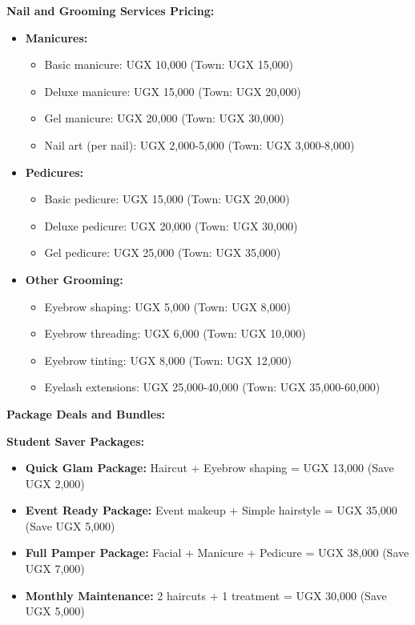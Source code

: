 \textbf{Nail and Grooming Services Pricing:}
\begin{itemize}[leftmargin=2em]
    \item \textbf{Manicures:}
    \begin{itemize}
        \item Basic manicure: UGX 10,000 (Town: UGX 15,000)
        \item Deluxe manicure: UGX 15,000 (Town: UGX 20,000)
        \item Gel manicure: UGX 20,000 (Town: UGX 30,000)
        \item Nail art (per nail): UGX 2,000-5,000 (Town: UGX 3,000-8,000)
    \end{itemize}
    
    \item \textbf{Pedicures:}
    \begin{itemize}
        \item Basic pedicure: UGX 15,000 (Town: UGX 20,000)
        \item Deluxe pedicure: UGX 20,000 (Town: UGX 30,000)
        \item Gel pedicure: UGX 25,000 (Town: UGX 35,000)
    \end{itemize}
    
    \item \textbf{Other Grooming:}
    \begin{itemize}
        \item Eyebrow shaping: UGX 5,000 (Town: UGX 8,000)
        \item Eyebrow threading: UGX 6,000 (Town: UGX 10,000)
        \item Eyebrow tinting: UGX 8,000 (Town: UGX 12,000)
        \item Eyelash extensions: UGX 25,000-40,000 (Town: UGX 35,000-60,000)
    \end{itemize}
\end{itemize}

\vspace{1em}

\textbf{Package Deals and Bundles:}

\textbf{Student Saver Packages:}
\begin{itemize}[leftmargin=2em]
    \item \textbf{Quick Glam Package:} Haircut + Eyebrow shaping = UGX 13,000 (Save UGX 2,000)
    \item \textbf{Event Ready Package:} Event makeup + Simple hairstyle = UGX 35,000 (Save UGX 5,000)
    \item \textbf{Full Pamper Package:} Facial + Manicure + Pedicure = UGX 38,000 (Save UGX 7,000)
    \item \textbf{Monthly Maintenance:} 2 haircuts + 1 treatment = UGX 30,000 (Save UGX 5,000)
\end{itemize}

